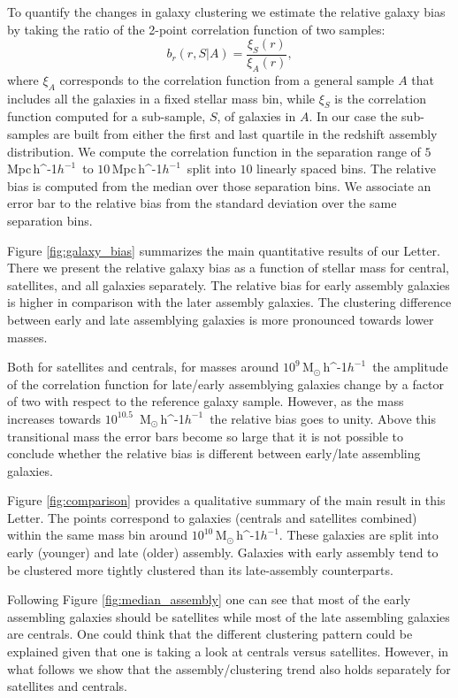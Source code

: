 \documentclass[fleqn,usenatbib]{mnras}
\newcommand{\Msunh}{\,{\rm M}$_{\odot}$\,\ifmmode h^{-1}\else $h^{-1}$\fi}
\newcommand{\Mpch}{\,{\rm Mpc}\,\ifmmode h^{-1}\else $h^{-1}$\fi}
\begin{document}
To quantify the changes in galaxy clustering we estimate the relative
galaxy bias by taking the ratio of the 2-point correlation function of two
samples: 
%
\begin{equation}
b_r(r, S|A)= \frac{\xi_S(r)}{\xi_A(r)}, 
\label{eq:relative}
\end{equation}
%
where $\xi_A$ corresponds to the correlation function from a general
sample $A$ that includes all the galaxies in a fixed stellar mass bin,
while $\xi_S$ is the correlation function computed for a sub-sample,
$S$, of galaxies in $A$. 
In our case the sub-samples are built from either the first and last
quartile in the redshift assembly distribution. 
We compute the correlation function in the separation range of
$5$\Mpch\ to $10$\Mpch\ split into $10$ linearly spaced bins. 
The relative bias is computed from the median over those separation bins.
We associate an error bar to the relative bias from the standard
deviation over the same separation bins.


Figure \ref{fig:galaxy_bias} summarizes the main quantitative results
of our Letter.
There we present the relative galaxy bias as a
function of stellar mass for central, satellites, and all galaxies
separately. 
The relative bias for early assembly galaxies is higher in comparison
with the later assembly galaxies.
The clustering difference between early and late assemblying galaxies
is more pronounced towards lower masses.

Both for satellites and centrals, for masses around
$10^{9}$\Msunh\ the amplitude of the correlation function for
late/early assemblying galaxies change by a factor of two with respect
to the reference galaxy sample. 
However, as the mass increases towards $10^{10.5}$ \Msunh\ the relative
bias goes to unity.  
Above this transitional mass the error bars become so large that 
it is not possible to conclude whether the relative bias is different
between early/late assembling galaxies.  

Figure \ref{fig:comparison} provides a qualitative summary of the main
result in this Letter.
The points correspond to galaxies (centrals and satellites combined) 
within the same mass bin around $10^{10}$\Msunh. 
These galaxies are split into early (younger) and late (older)
assembly. 
Galaxies with early assembly tend to be clustered more tightly
clustered than its late-assembly counterparts.

Following Figure \ref{fig:median_assembly} one can see that most of the early
assembling galaxies should be satellites while most of the late
assembling galaxies are centrals. 
One could think that the different clustering pattern could be
explained given that one is taking a look at centrals versus
satellites. 
However, in what follows we show that the assembly/clustering trend also
holds separately for satellites and centrals.  
\end{document}
